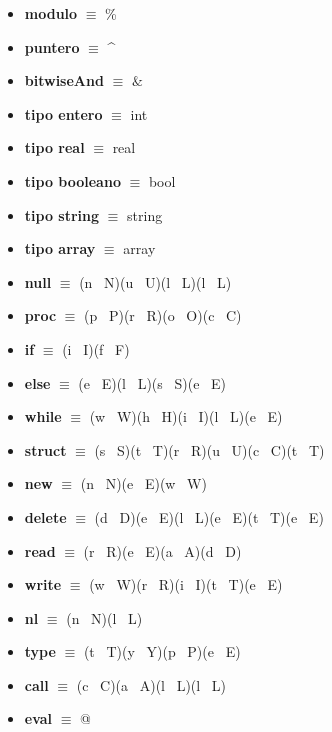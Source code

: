 \documentclass[11pt]{article}
\begin{document}
\begin{itemize}
            \item \textbf{modulo }$\equiv$ \%
            \item \textbf{puntero }$\equiv$ \^{}
            \item \textbf{bitwiseAnd }$\equiv$ $\&$
            \item \textbf{tipo entero }$\equiv$ int
            \item \textbf{tipo real }$\equiv$ real
            \item \textbf{tipo booleano }$\equiv$ bool
            \item \textbf{tipo string }$\equiv$ string
            \item \textbf{tipo array }$\equiv$ array
            \item \textbf{null }$\equiv$ (n \textbar\ N)(u \textbar\ U)(l \textbar\ L)(l \textbar\ L)
            \item \textbf{proc }$\equiv$ (p \textbar\ P)(r \textbar\ R)(o \textbar\ O)(c \textbar\ C)
            \item \textbf{if }$\equiv$ (i \textbar\ I)(f \textbar\ F)
            \item \textbf{else }$\equiv$ (e \textbar\ E)(l \textbar\ L)(s \textbar\ S)(e \textbar\ E)
            \item \textbf{while }$\equiv$ (w \textbar\ W)(h \textbar\ H)(i \textbar\ I)(l \textbar\ L)(e \textbar\ E)
            \item \textbf{struct }$\equiv$ (s \textbar\ S)(t \textbar\ T)(r \textbar\ R)(u \textbar\ U)(c \textbar\ C)(t \textbar\ T)
            \item \textbf{new }$\equiv$ (n \textbar\ N)(e \textbar\ E)(w \textbar\ W)
            \item \textbf{delete }$\equiv$ (d \textbar\ D)(e \textbar\ E)(l \textbar\ L)(e \textbar\ E)(t \textbar\ T)(e \textbar\ E)
            \item \textbf{read }$\equiv$ (r \textbar\ R)(e \textbar\ E)(a \textbar\ A)(d \textbar\ D)
            \item \textbf{write }$\equiv$ (w \textbar\ W)(r \textbar\ R)(i \textbar\ I)(t \textbar\ T)(e \textbar\ E)
            \item \textbf{nl }$\equiv$ (n \textbar\ N)(l \textbar\ L)
            \item \textbf{type }$\equiv$ (t \textbar\ T)(y \textbar\ Y)(p \textbar\ P)(e \textbar\ E)
            \item \textbf{call }$\equiv$ (c \textbar\ C)(a \textbar\ A)(l \textbar\ L)(l \textbar\ L)
            \item \textbf{eval }$\equiv$ @

\end{itemize}
\end{document}
